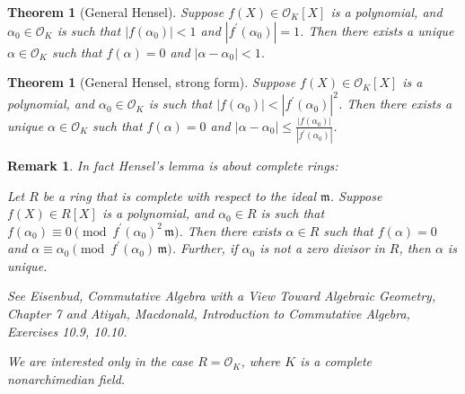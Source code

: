 \documentclass{article}
\theoremstyle{myplain}
\newtheorem{theorem}[proposition]{Theorem}
\theoremstyle{mydefinition}
\newtheorem{remark}[proposition]{Remark}
\begin{document}
\begin{theorem}[General Hensel]
  Suppose $f (X) \in \mathcal{O}_K [X]$ is a polynomial, and $\alpha_0 \in \mathcal{O}_K$ is such
  that $|f (\alpha_0)| < 1$ and $|f^\prime (\alpha_0)| = 1$. Then there exists a
  unique $\alpha \in \mathcal{O}_K$ such that $f (\alpha) = 0$ and
  $|\alpha - \alpha_0| < 1$.
\end{theorem}

\begin{theorem}[General Hensel, strong form]\label{theorem:general-hensel-strong}
  Suppose $f (X) \in \mathcal{O}_K [X]$ is a polynomial, and $\alpha_0 \in \mathcal{O}_K$ is such
  that $|f (\alpha_0)| < |f^\prime (\alpha_0)|^2$. Then there exists a unique
  $\alpha \in \mathcal{O}_K$ such that $f (\alpha) = 0$ and
  $|\alpha - \alpha_0| \le \frac{|f(\alpha_0)|}{|f^\prime (\alpha_0)|}$.
\end{theorem}

\begin{remark}
  In fact Hensel's lemma is about complete \emph{rings}:

  \noindent\emph{Let $R$ be a ring that is complete with respect to the ideal
    $\mathfrak{m}$. Suppose $f (X) \in R [X]$ is a polynomial, and
    $\alpha_0 \in R$ is such that
    $f (\alpha_0) \equiv 0 \pmod{f^\prime (\alpha_0)^2\,\mathfrak{m}}$. Then
    there exists $\alpha \in R$ such that $f (\alpha) = 0$ and
    $\alpha \equiv \alpha_0 \pmod{f^\prime (\alpha_0)\,\mathfrak{m}}$. Further,
    if $\alpha_0$ is not a zero divisor in $R$, then $\alpha$ is unique.}

  See \emph{Eisenbud, Commutative Algebra with a View Toward Algebraic Geometry,
    Chapter 7} and \emph{Atiyah, Macdonald, Introduction to Commutative Algebra,
    Exercises 10.9, 10.10}.

  We are interested only in the case $R = \mathcal{O}_K$, where $K$ is a complete
  nonarchimedian field.
\end{remark}
\end{document}
